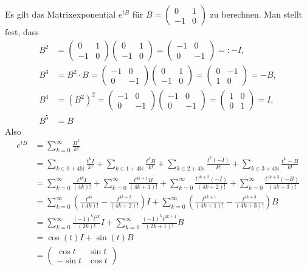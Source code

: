 \documentclass[a4paper]{article}
\begin{document}
\subsection{}
Es gilt das Matrixexponential $e^{tB}$ für $B=\begin{pmatrix}
0&1\\-1&0
\end{pmatrix}$ zu berechnen.
Man stellt fest, dass
\begin{align*}
B^2 &= \begin{pmatrix}
0&1\\-1&0
\end{pmatrix} \begin{pmatrix}
0&1\\-1&0
\end{pmatrix} = \begin{pmatrix}
-1&0\\0&-1
\end{pmatrix} =: -I,\\
B^3 &= B^2 \cdot B = \begin{pmatrix}
-1&0\\0&-1
\end{pmatrix} \begin{pmatrix}
0&1\\-1&0
\end{pmatrix} = \begin{pmatrix}0&-1\\1&0\end{pmatrix} = -B,\\
B^4 &= (B^2)^2 =  \begin{pmatrix}
-1&0\\0&-1
\end{pmatrix} \begin{pmatrix}
-1&0\\0&-1
\end{pmatrix} = \begin{pmatrix}
1&0\\0&1\end{pmatrix} = I,\\
B^5 &= B
\end{align*}
Also
\begin{align*}
e^{tB} &= \sum_{k=0}^∞ \frac{B^k}{k!}\\
&= \sum_{k \in 0+4ℕ} \frac{t^kI}{k!} + \sum_{k\in 1+4ℕ} \frac{t^kB}{k!} + \sum_{k\in 2+ 4ℕ} \frac{t^k (-I)}{k!} + \sum_{k\in 3+4ℕ} \frac{t^k-B}{k!}\\&=
\sum_{k=0}^\infty \frac{t^{4k}I}{(4k)!} + \sum_{k=0}^∞ \frac{t^{4k+1}B}{(4k+1)!} +\sum_{k=0}^∞ \frac{t^{4k+2}(-I)}{(4k+2)!} +\sum_{k=0}^∞\frac{t^{4k+3}(-B)}{(4k+3)!}\\
&= \sum_{k=0}^∞ \left(\frac{t^{4k}}{(4k)!} - \frac{t^{4k+2}}{(4k+2)!} \right)I +
\sum_{k=0}^∞ \left(\frac{t^{4k+1}}{(4k+1)!} - \frac{t^{4k+3}}{(4k+3)!} \right)B\\
&= \sum_{k=0}^∞ \frac{(-1)^k t^{2k}}{(2k)!} I +\sum_{k=0}^∞ \frac{(-1)^kt^{2k+1}}{(2k+1)!} B\\
&=\cos(t)I + \sin(t) B\\
&=\begin{pmatrix}
\cos t & \sin t\\
-\sin t & \cos t
\end{pmatrix} 
\end{align*}
\end{document}
